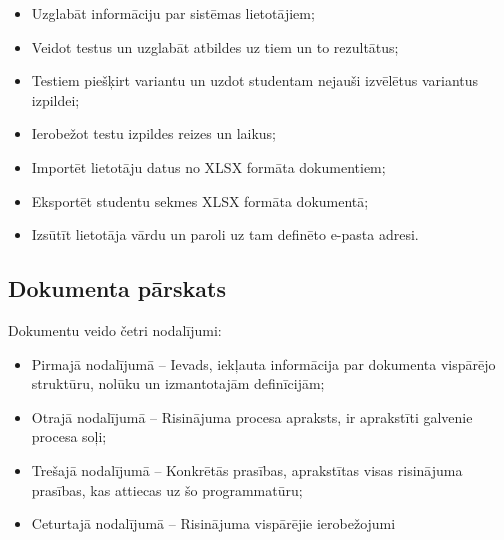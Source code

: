 \begin{itemize}[noitemsep, nolistsep]
    \item Uzglabāt informāciju par sistēmas lietotājiem;
    \item Veidot testus un uzglabāt atbildes uz tiem un to rezultātus;
    \item Testiem piešķirt variantu un uzdot studentam nejauši izvēlētus variantus izpildei;
    \item Ierobežot testu izpildes reizes un laikus;
    \item Importēt lietotāju datus no XLSX formāta dokumentiem;
    \item Eksportēt studentu sekmes XLSX formāta dokumentā;
    \item Izsūtīt lietotāja vārdu un paroli uz tam definēto e-pasta adresi.
\end{itemize}

\subsection{Dokumenta pārskats}

Dokumentu veido četri nodalījumi:

\begin{itemize}[noitemsep, nolistsep]
    \item Pirmajā nodalījumā – Ievads, iekļauta informācija par dokumenta vispārējo struktūru,
          nolūku un izmantotajām definīcijām;
    \item Otrajā nodalījumā – Risinājuma procesa apraksts, ir aprakstīti galvenie procesa soļi;
    \item Trešajā nodalījumā – Konkrētās prasības, aprakstītas visas risinājuma prasības, kas attiecas
          uz šo programmatūru;
    \item Ceturtajā nodalījumā – Risinājuma vispārējie ierobežojumi
\end{itemize}

\newpage
